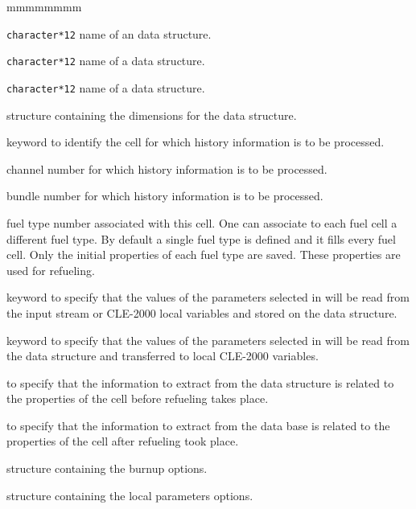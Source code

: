 \begin{ListeDeDescription}{mmmmmmmm}  

\item[\dusa{\dds{history}}] \verb|character*12| name of an  data structure. 

\item[\dusa{\dds{burnup}}] \verb|character*12| name of a  data structure. 

\item[\dusa{\dds{map}}] \verb|character*12| name of a  data structure. 

\item[\dstr{hstdim}] structure containing the dimensions for the  data structure.

\item[\moc{CELLID}] keyword to identify the cell for which history information is to be processed.

\item[\dusa{icha}] channel number for which history information is to be processed. 

\item[\dusa{ibun}] bundle number for which history information is to be processed. 

\item[\dusa{idfuel}] fuel type number associated with this cell. One can associate to each fuel cell a different fuel type. By default a single fuel type is
defined and it fills every fuel cell. Only the initial properties of each fuel type are saved. These properties are used for refueling. 

\item[\moc{GET}] keyword to specify that the values of the parameters selected in  will be read from the input stream or CLE-2000 local variables
and stored on the  data structure.

\item[\moc{PUT}] keyword to specify that the values of the parameters selected in  will be read from the  data structure and
transferred to local CLE-2000 variables.

\item[\moc{BREFL}] to specify that the information to extract from the  data structure is related to the properties of the cell before refueling takes
place.

\item[\moc{AREFL}] to specify that the information to extract from the  data base is related to the properties of the cell after refueling took
place.

 \item[\dstr{hstbrn}] structure containing the burnup options.

\item[\dstr{hstpar}] structure containing the local parameters options.
\end{ListeDeDescription}

